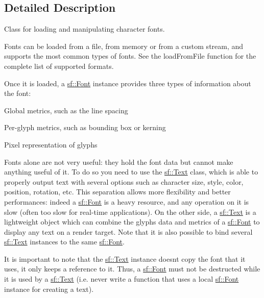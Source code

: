\subsection{Detailed Description}
Class for loading and manipulating character fonts. 

Fonts can be loaded from a file, from memory or from a custom stream, and supports the most common types of fonts. See the load\+From\+File function for the complete list of supported formats.

Once it is loaded, a \hyperlink{classsf_1_1_font}{sf\+::\+Font} instance provides three types of information about the font\+: \begin{DoxyItemize}
\item Global metrics, such as the line spacing \item Per-\/glyph metrics, such as bounding box or kerning \item Pixel representation of glyphs\end{DoxyItemize}
Fonts alone are not very useful\+: they hold the font data but cannot make anything useful of it. To do so you need to use the \hyperlink{classsf_1_1_text}{sf\+::\+Text} class, which is able to properly output text with several options such as character size, style, color, position, rotation, etc. This separation allows more flexibility and better performances\+: indeed a \hyperlink{classsf_1_1_font}{sf\+::\+Font} is a heavy resource, and any operation on it is slow (often too slow for real-\/time applications). On the other side, a \hyperlink{classsf_1_1_text}{sf\+::\+Text} is a lightweight object which can combine the glyphs data and metrics of a \hyperlink{classsf_1_1_font}{sf\+::\+Font} to display any text on a render target. Note that it is also possible to bind several \hyperlink{classsf_1_1_text}{sf\+::\+Text} instances to the same \hyperlink{classsf_1_1_font}{sf\+::\+Font}.

It is important to note that the \hyperlink{classsf_1_1_text}{sf\+::\+Text} instance doesn\textquotesingle{}t copy the font that it uses, it only keeps a reference to it. Thus, a \hyperlink{classsf_1_1_font}{sf\+::\+Font} must not be destructed while it is used by a \hyperlink{classsf_1_1_text}{sf\+::\+Text} (i.\+e. never write a function that uses a local \hyperlink{classsf_1_1_font}{sf\+::\+Font} instance for creating a text).

